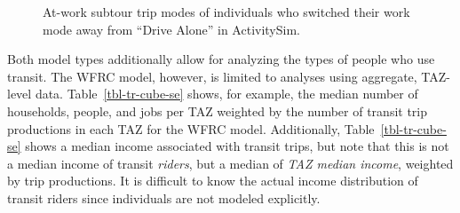 \documentclass[fancy, oneside, mastersfancy, ms]{byuthesis}
\begin{document}
\begin{figure}


\caption{\label{fig-tr-atwork-switching}At-work subtour trip modes of
individuals who switched their work mode away from ``Drive Alone'' in
ActivitySim.}

\end{figure}%

Both model types additionally allow for analyzing the types of people
who use transit. The WFRC model, however, is limited to analyses using
aggregate, TAZ-level data. Table~\ref{tbl-tr-cube-se} shows, for
example, the median number of households, people, and jobs per TAZ
weighted by the number of transit trip productions in each TAZ for the
WFRC model. Additionally, Table~\ref{tbl-tr-cube-se} shows a median
income associated with transit trips, but note that this is not a median
income of transit \emph{riders}, but a median of \emph{TAZ median
income}, weighted by trip productions. It is difficult to know the
actual income distribution of transit riders since individuals are not
modeled explicitly.

\begin{table}

\caption{\label{tbl-tr-cube-se}Example Socioeconomic Analysis of Transit
Trips (WFRC Model)}


\end{table}%
\end{document}
